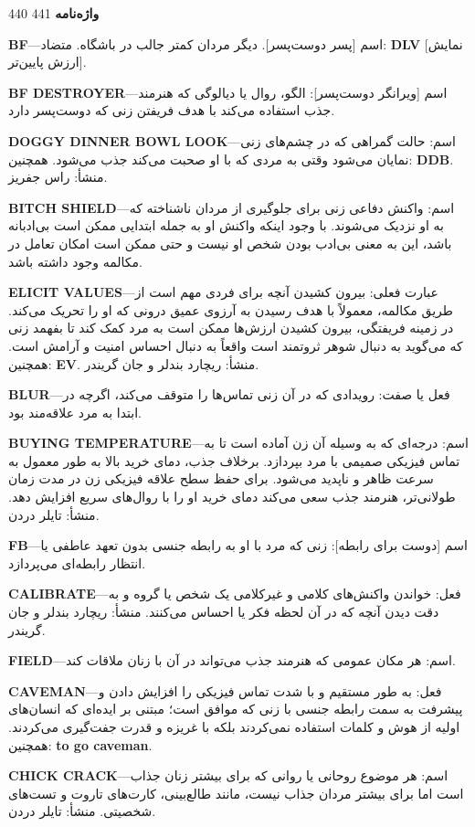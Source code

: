 440 \textbf{واژه‌نامه} 441

\textbf{BF}—اسم [پسر دوست‌پسر]. دیگر مردان کمتر جالب در باشگاه. متضاد: \textbf{DLV} [نمایش ارزش پایین‌تر].

\textbf{BF DESTROYER}—اسم [ویرانگر دوست‌پسر]: الگو، روال یا دیالوگی که هنرمند جذب استفاده می‌کند با هدف فریفتن زنی که دوست‌پسر دارد.

\textbf{DOGGY DINNER BOWL LOOK}—اسم: حالت گمراهی که در چشم‌های زنی نمایان می‌شود وقتی به مردی که با او صحبت می‌کند جذب می‌شود. همچنین: \textbf{DDB}. منشأ: راس جفریز.

\textbf{BITCH SHIELD}—اسم: واکنش دفاعی زنی برای جلوگیری از مردان ناشناخته که به او نزدیک می‌شوند. با وجود اینکه واکنش او به جمله ابتدایی ممکن است بی‌ادبانه باشد، این به معنی بی‌ادب بودن شخص او نیست و حتی ممکن است امکان تعامل در مکالمه وجود داشته باشد.

\textbf{ELICIT VALUES}—عبارت فعلی: بیرون کشیدن آنچه برای فردی مهم است از طریق مکالمه، معمولاً با هدف رسیدن به آرزوی عمیق درونی که او را تحریک می‌کند. در زمینه فریفتگی، بیرون کشیدن ارزش‌ها ممکن است به مرد کمک کند تا بفهمد زنی که می‌گوید به دنبال شوهر ثروتمند است واقعاً به دنبال احساس امنیت و آرامش است. همچنین: \textbf{EV}. منشأ: ریچارد بندلر و جان گریندر.

\textbf{BLUR}—فعل یا صفت: رویدادی که در آن زنی تماس‌ها را متوقف می‌کند، اگرچه در ابتدا به مرد علاقه‌مند بود.

\textbf{BUYING TEMPERATURE}—اسم: درجه‌ای که به وسیله آن زن آماده است تا به تماس فیزیکی صمیمی با مرد بپردازد. برخلاف جذب، دمای خرید بالا به طور معمول به سرعت ظاهر و ناپدید می‌شود. برای حفظ سطح علاقه فیزیکی زن در مدت زمان طولانی‌تر، هنرمند جذب سعی می‌کند دمای خرید او را با روال‌های سریع افزایش دهد. منشأ: تایلر دردن.

\textbf{FB}—اسم [دوست برای رابطه]: زنی که مرد با او به رابطه جنسی بدون تعهد عاطفی یا انتظار رابطه‌ای می‌پردازد.

\textbf{CALIBRATE}—فعل: خواندن واکنش‌های کلامی و غیرکلامی یک شخص یا گروه و به دقت دیدن آنچه که در آن لحظه فکر یا احساس می‌کنند. منشأ: ریچارد بندلر و جان گریندر.

\textbf{FIELD}—اسم: هر مکان عمومی که هنرمند جذب می‌تواند در آن با زنان ملاقات کند.

\textbf{CAVEMAN}—فعل: به طور مستقیم و با شدت تماس فیزیکی را افزایش دادن و پیشرفت به سمت رابطه جنسی با زنی که موافق است؛ مبتنی بر ایده‌ای که انسان‌های اولیه از هوش و کلمات استفاده نمی‌کردند بلکه با غریزه و قدرت جفت‌گیری می‌کردند. همچنین: \textbf{to go caveman}.

\textbf{CHICK CRACK}—اسم: هر موضوع روحانی یا روانی که برای بیشتر زنان جذاب است اما برای بیشتر مردان جذاب نیست، مانند طالع‌بینی، کارت‌های تاروت و تست‌های شخصیتی. منشأ: تایلر دردن.


